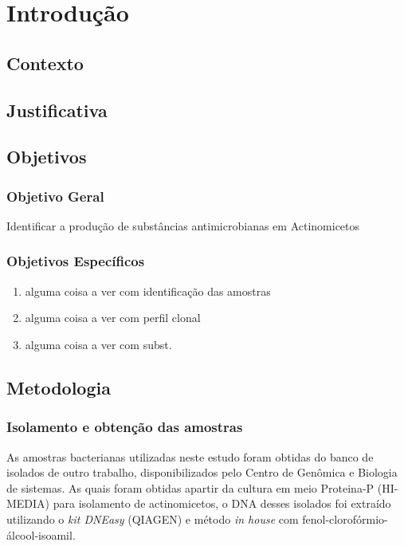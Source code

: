 \chapter{Introdução}
\label{cap:introducao}

\section{Contexto}



\section{Justificativa}


\section{Objetivos}

\subsection{Objetivo Geral}

Identificar a produção de substâncias antimicrobianas em Actinomicetos

\subsection{Objetivos Específicos}
\begin{enumerate}
    \item alguma coisa a ver com identificação das amostras %
    \item alguma coisa a ver com perfil clonal %
    \item alguma coisa a ver com subst. %
\end{enumerate}

\section{Metodologia}
\subsection{Isolamento e obtenção das amostras}
As amostras bacterianas utilizadas neste estudo foram obtidas do banco de isolados de outro
trabalho, disponibilizados pelo Centro de Genômica e Biologia de sistemas. As quais foram
obtidas apartir da cultura em meio Proteina-P (HI-MEDIA) para isolamento de actinomicetos,
o DNA desses isolados foi extraído utilizando o \textit{kit DNEasy} (QIAGEN) e
método \textit{in house} com fenol-clorofórmio-álcool-isoamil.


